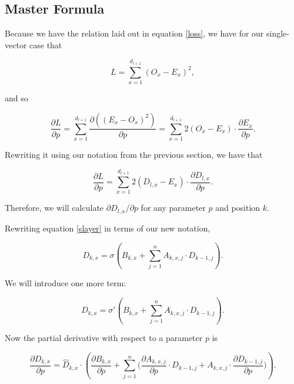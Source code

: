 \documentclass{article}
\begin{document}
\subsection{Master Formula}

Because we have the relation laid out in equation \ref{loss}, we have for our single-vector case that

\begin{equation}
\label{svloss}
L = \sum_{x=1}^{d_{l+1}} (O_x - E_x)^2,
\end{equation}

and so

\begin{equation}
\frac{\partial L}{\partial p} = \sum_{x=1}^{d_{l+1}} \frac{\partial ((E_x - O_x)^2)}{\partial p} = \sum_{x=1}^{d_{l+1}} 2(O_x - E_x) \cdot \frac{\partial{E_x}}{\partial p}.
\end{equation}

Rewriting it using our notation from the previous section, we have that

\begin{equation}
\label{pdloss}
\frac{\partial L}{\partial p} = \sum_{x=1}^{d_{l+1}} 2(D_{l,x} - E_x) \cdot \frac{\partial{D_{l,x}}}{\partial p}.
\end{equation}

Therefore, we will calculate $\partial D_{l,x}/\partial p$ for any parameter $p$ and position $k.$

Rewriting equation \ref{slayer} in terms of our new notation,

\begin{equation}
\label{pslayer}
D_{k,x} = \sigma(B_{k,x} + \sum_{j=1}^n A_{k,x,j} \cdot D_{k-1,j}).
\end{equation}

We will introduce one more term:

\begin{equation}
\label{dhat}
\hat D_{k,x} = \sigma'(B_{k,x} + \sum_{j=1}^n A_{k,x,j} \cdot D_{k-1,j}).
\end{equation}

Now the partial derivative with respect to a parameter $p$ is

\begin{equation}
\label{pdentry}
\frac{\partial D_{k,x}}{\partial p} = \hat D_{k,x} \cdot (\frac{\partial B_{k,x}}{\partial p} + \sum_{j=1}^n \biggr ( \frac{\partial A_{k,x,j}}{\partial p} \cdot D_{k-1,j} + A_{k,x,j} \cdot \frac{\partial D_{k-1,j}}{\partial p} \biggr ) ).
\end{equation}
\end{document}
